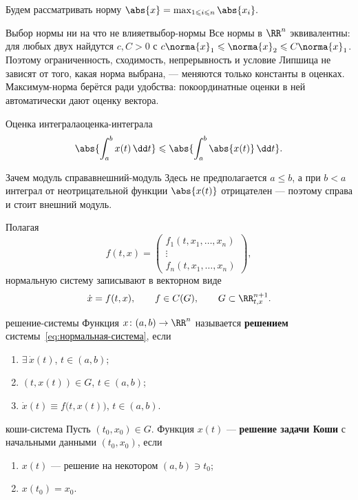 Будем рассматривать норму $\abs{x} = \max_{1 \leqslant i \leqslant n} \abs{x_i}.$

\begin{Remark}[addon]{Выбор нормы ни на что не влияет}{выбор-нормы}
	Все нормы в $\RR^n$ эквивалентны: для любых двух найдутся $c, C > 0$ с
	$c\norma{x}_1 \leqslant \norma{x}_2 \leqslant C\norma{x}_1$. Поэтому
	ограниченность, сходимость, непрерывность и условие Липшица не зависят от
	того, какая норма выбрана, --- меняются только константы в оценках.
	Максимум-норма берётся ради удобства: покоординатные оценки в ней
	автоматически дают оценку вектора.
\end{Remark}

\begin{Statement}{Оценка интеграла}{оценка-интеграла}
	\[
	\abs{\int_a^b x(t)\,\dd t} \leqslant \abs{\int_a^b \abs{x(t)}\,\dd t}.
	\]
\end{Statement}

\begin{Remark}[addon]{Зачем модуль справа}{внешний-модуль}
	Здесь не предполагается $a \leqslant b$, а при $b < a$ интеграл от
	неотрицательной функции $\abs{x(t)}$ отрицателен --- поэтому справа и стоит
	внешний модуль.
\end{Remark}

Полагая
\[
f(t,x) = \begin{pmatrix}
	f_1(t, x_1, \dots, x_n) \\ \vdots \\ f_n(t, x_1, \dots, x_n)
\end{pmatrix},
\]
нормальную систему записывают в векторном виде
\begin{equation}\label{eq:нормальная-система}
	\dot x = f(t,x), \qquad f \in C(G), \qquad G \subset \RR^{n+1}_{t,x}.
\end{equation}

\begin{Definition}{}{решение-системы}
	Функция $x \colon (a,b) \to \RR^n$ называется \textbf{решением}
	системы~\eqref{eq:нормальная-система}, если
	\begin{enumerate}
		\item $\exists\, \dot x(t)$, $t \in (a,b)$;
		\item $(t, x(t)) \in G$, $t \in (a,b)$;
		\item $\dot x(t) \equiv f\bigl(t, x(t)\bigr)$, $t \in (a,b)$.
	\end{enumerate}
\end{Definition}

\begin{Definition}{}{коши-система}
	Пусть $(t_0, x_0) \in G$. Функция $x(t)$ --- \textbf{решение задачи Коши}
	с начальными данными $(t_0,x_0)$, если
	\begin{enumerate}
		\item $x(t)$ --- решение на некотором $(a,b) \ni t_0$;
		\item $x(t_0) = x_0$.
	\end{enumerate}
\end{Definition}


